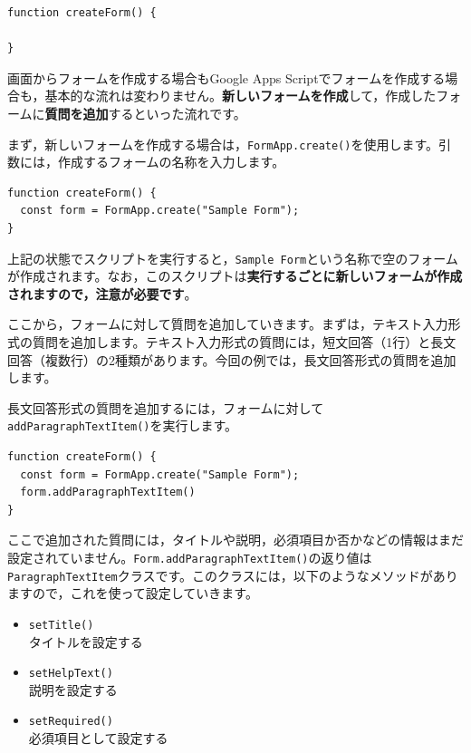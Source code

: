 \documentclass[uplatex,a4j]{jsarticle}
\begin{document}
\begin{lstlisting}[basicstyle=\ttfamily\footnotesize,frame=single,caption=FormApp sample 1]
function createForm() {

}
\end{lstlisting}

画面からフォームを作成する場合もGoogle Apps Scriptでフォームを作成する場合も，基本的な流れは変わりません。\textbf{新しいフォームを作成}して，作成したフォームに\textbf{質問を追加}するといった流れです。

まず，新しいフォームを作成する場合は，\verb|FormApp.create()|を使用します。引数には，作成するフォームの名称を入力します。

\begin{lstlisting}[basicstyle=\ttfamily\footnotesize,frame=single,caption=FormApp sample 2]
function createForm() {
  const form = FormApp.create("Sample Form");
}
\end{lstlisting}

上記の状態でスクリプトを実行すると，\verb|Sample Form|という名称で空のフォームが作成されます。なお，このスクリプトは\textbf{実行するごとに新しいフォームが作成されますので，注意が必要です}。

ここから，フォームに対して質問を追加していきます。まずは，テキスト入力形式の質問を追加します。テキスト入力形式の質問には，短文回答（1行）と長文回答（複数行）の2種類があります。今回の例では，長文回答形式の質問を追加します。

長文回答形式の質問を追加するには，フォームに対して\verb|addParagraphTextItem()|を実行します。

\begin{lstlisting}[basicstyle=\ttfamily\footnotesize,frame=single,caption=FormApp sample 3]
function createForm() {
  const form = FormApp.create("Sample Form");
  form.addParagraphTextItem()
}
\end{lstlisting}

ここで追加された質問には，タイトルや説明，必須項目か否かなどの情報はまだ設定されていません。\verb|Form.addParagraphTextItem()|の返り値は\verb|ParagraphTextItem|クラスです。このクラスには，以下のようなメソッドがありますので，これを使って設定していきます。

\begin{itemize}
\item \verb|setTitle()|\\
タイトルを設定する
\item \verb|setHelpText()|\\
説明を設定する
\item \verb|setRequired()|\\
必須項目として設定する
\end{itemize}
\end{document}

